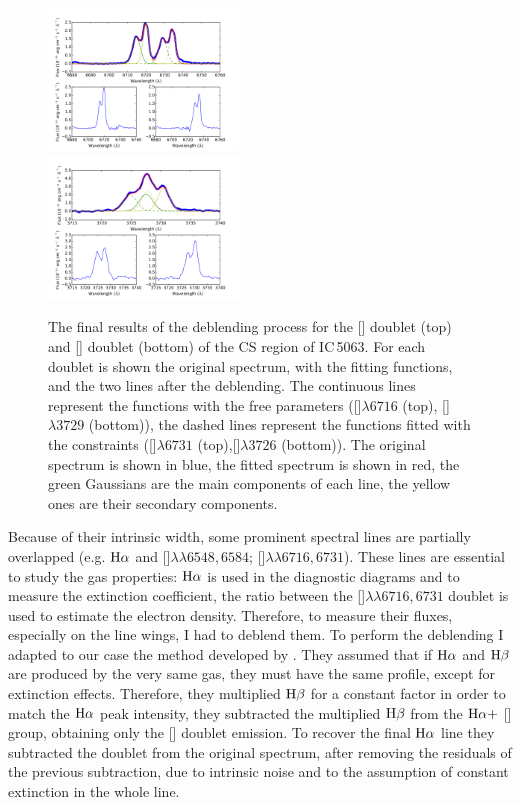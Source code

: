 \documentclass[../main.tex]{subfiles}
\begin{document}
\begin{figure}
\centering
\includegraphics[width=0.45\textwidth]{images/paper1/s2.pdf} \\
\vskip0.2cm
\includegraphics[width=0.45\textwidth]{images/paper1/o2.pdf}\\
\caption[]{The final results of the deblending process for the [] doublet (top) and [] doublet (bottom) of the CS region of IC\,5063. For each doublet is shown the original spectrum, with the fitting functions, and the two lines after the deblending. The continuous lines represent the functions with the free parameters ([]$\lambda6716$ (top), []$\lambda3729$ (bottom)), the dashed lines represent the functions fitted with the constraints ([]$\lambda6731$ (top),[]$\lambda3726$ (bottom)). The original spectrum is shown in blue, the fitted spectrum is shown in red, the green Gaussians are the main components of each line, the yellow ones are their secondary components. }
\label{fig:deb}
\end{figure}

Because of their intrinsic width, some prominent spectral lines are partially overlapped (e.g. $\rm H\alpha$ and []$\lambda\lambda6548,6584$; []$\lambda\lambda6716,6731$).
These lines are essential to study the gas properties: $\rm H\alpha$ is used in the diagnostic diagrams \citep{Baldwin81,Veilleux87}  and to measure the extinction coefficient, the ratio between the []$\lambda\lambda6716,6731$ doublet is used to estimate the electron density.
Therefore, to measure their fluxes, especially on the line wings, I had to deblend them.
To perform the deblending I adapted to our case the method developed by \citet{Schirmer13}.
They assumed that if $\rm H\alpha$ and $\rm H\beta$ are produced by the very same gas, they must have the same profile, except for extinction effects.
Therefore, they multiplied $\rm H\beta$ for a constant factor in order to match the $\rm H\alpha$ peak intensity, they subtracted the multiplied $\rm H\beta$ from the $\rm H\alpha +$ [] group, obtaining only the [] doublet emission.
To recover the final $\rm H\alpha$ line they subtracted the doublet from the original spectrum, after removing the residuals of the previous subtraction, due to intrinsic noise and to the assumption of constant extinction in the whole line.
\end{document}
